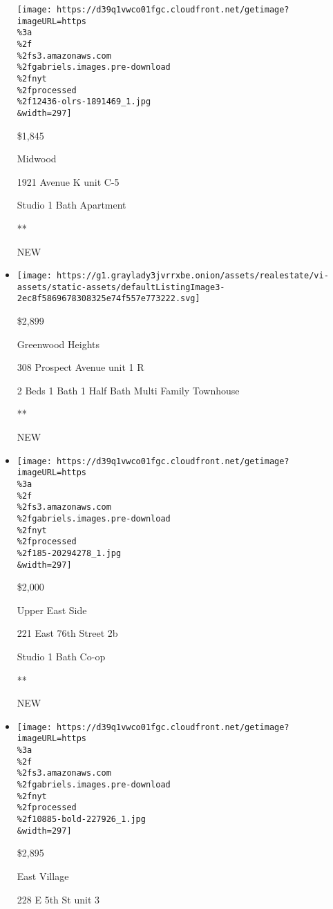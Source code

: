 \begin{itemize}
  \texttt{[image: https://d39q1vwco01fgc.cloudfront.net/getimage?imageURL=https\\\%3a\\\%2f\\\%2fs3.amazonaws.com\\\%2fgabriels.images.pre-download\\\%2fnyt\\\%2fprocessed\\\%2f12436-olrs-1891469\_1.jpg\\\&width=297]}

  \$1,845

  Midwood

  1921 Avenue K unit C-5

  Studio \textbar{} 1 Bath \textbar{} Apartment

  **

  NEW
\item
  \href{/real-estate/usa/ny/brooklyn/greenwood-heights/homes-for-rent/308-prospect-avenue/13278-PRCH-3015693?}{}

  \texttt{[image: https://g1.graylady3jvrrxbe.onion/assets/realestate/vi-assets/static-assets/defaultListingImage3-2ec8f5869678308325e74f557e773222.svg]}

  \$2,899

  Greenwood Heights

  308 Prospect Avenue unit 1 R

  2 Beds \textbar{} 1 Bath \textbar{} 1 Half Bath \textbar{} Multi
  Family Townhouse

  **

  NEW
\item
  \href{/real-estate/usa/ny/new-york/upper-east-side/homes-for-rent/221-east-76th-street-2b/185-20294278?}{}

  \texttt{[image: https://d39q1vwco01fgc.cloudfront.net/getimage?imageURL=https\\\%3a\\\%2f\\\%2fs3.amazonaws.com\\\%2fgabriels.images.pre-download\\\%2fnyt\\\%2fprocessed\\\%2f185-20294278\_1.jpg\\\&width=297]}

  \$2,000

  Upper East Side

  221 East 76th Street 2b

  Studio \textbar{} 1 Bath \textbar{} Co-op

  **

  NEW
\item
  \href{/real-estate/usa/ny/new-york/east-village/homes-for-rent/228-e-5th-st/10885-BOLD-227926?}{}

  \texttt{[image: https://d39q1vwco01fgc.cloudfront.net/getimage?imageURL=https\\\%3a\\\%2f\\\%2fs3.amazonaws.com\\\%2fgabriels.images.pre-download\\\%2fnyt\\\%2fprocessed\\\%2f10885-bold-227926\_1.jpg\\\&width=297]}

  \$2,895

  East Village

  228 E 5th St unit 3


\end{itemize}
